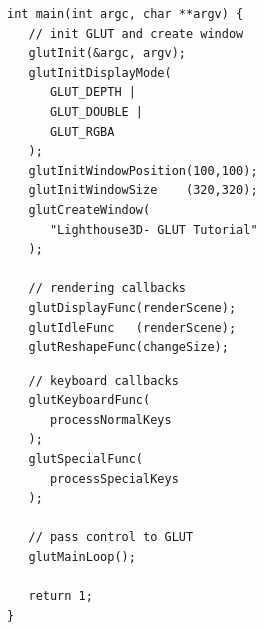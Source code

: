 \begin{frame}[fragile]
%
%
\begin{codebox}
\begin{verbatim}
int main(int argc, char **argv) {
   // init GLUT and create window
   glutInit(&argc, argv);
   glutInitDisplayMode(
      GLUT_DEPTH | 
      GLUT_DOUBLE | 
      GLUT_RGBA
   );
   glutInitWindowPosition(100,100);
   glutInitWindowSize    (320,320);
   glutCreateWindow(
      "Lighthouse3D- GLUT Tutorial"
   );

   // rendering callbacks
   glutDisplayFunc(renderScene);
   glutIdleFunc   (renderScene);
   glutReshapeFunc(changeSize);
\end{verbatim}
\end{codebox}
%
\begin{codebox}[... Fortsetzung]
\begin{verbatim}
   // keyboard callbacks
   glutKeyboardFunc(
      processNormalKeys
   );
   glutSpecialFunc(
      processSpecialKeys
   );

   // pass control to GLUT
   glutMainLoop();

   return 1;
}
\end{verbatim}
\end{codebox}
%
\end{frame}


